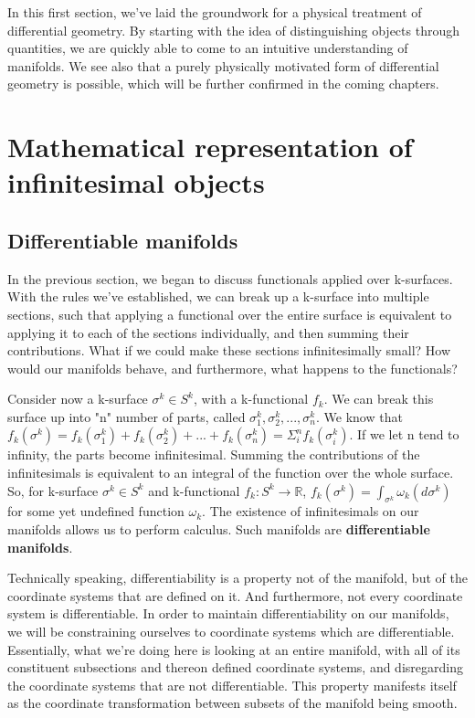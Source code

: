 \documentclass{book}
\begin{document}
In this first section, we've laid the groundwork for a physical treatment of differential geometry. By starting with the idea of distinguishing objects through quantities, we are quickly able to come to an intuitive understanding of manifolds. We see also that a purely physically motivated form of differential geometry is possible, which will be further confirmed in the coming chapters. 


\chapter{Mathematical representation of infinitesimal objects}


\section{Differentiable manifolds}

In the previous section, we began to discuss functionals applied over k-surfaces. With the rules we've established, we can break up a k-surface into multiple sections, such that applying a functional over the entire surface is equivalent to applying it to each of the sections individually, and then summing their contributions. What if we could make these sections infinitesimally small? How would our manifolds behave, and furthermore, what happens to the functionals?

Consider now a k-surface $\sigma^k \in S^k$, with a k-functional $f_k$. We can break this surface up into "n" number of parts, called $\sigma^k_1, \sigma^k_2, ..., \sigma^k_n$. We know that $f_k(\sigma^k) = f_k(\sigma^k_1) + f_k(\sigma^k_2) + ... + f_k(\sigma^k_n) = \Sigma^n_if_k(\sigma^k_i)$. If we let n tend to infinity, the parts become infinitesimal. Summing the contributions of the infinitesimals is equivalent to an integral of the function over the whole surface. So, for k-surface $\sigma^k \in S^k$ and k-functional $f_k: S^k \to \mathbb{R}$, $f_k(\sigma^k) = \int_{\sigma^k}\omega_k(d\sigma^k)$ for some yet undefined function $\omega_k$. The existence of infinitesimals on our manifolds allows us to perform calculus. Such manifolds are \textbf{differentiable manifolds}. 

Technically speaking, differentiability is a property not of the manifold, but of the coordinate systems that are defined on it. And furthermore, not every coordinate system is differentiable. In order to maintain differentiability on our manifolds, we will be constraining ourselves to coordinate systems which are differentiable. Essentially, what we're doing here is looking at an entire manifold, with all of its constituent subsections and thereon defined coordinate systems, and disregarding the coordinate systems that are not differentiable. This property manifests itself as the coordinate transformation between subsets of the manifold being smooth. 
\end{document}
